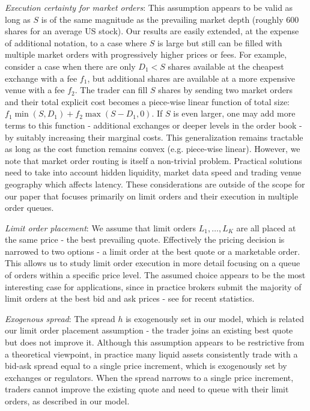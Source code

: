 \documentclass[opre,nonblindrev]{informs3}
\begin{document}
{\it Execution certainty for market orders}: This assumption appears to be valid as long as $S$ is of the same magnitude as the prevailing market depth (roughly 600 shares for an average US stock). Our results are easily extended, at the expense of additional notation, to a case where $S$ is large but still can be filled with multiple market orders with progressively higher prices or fees. For example, consider a case when there are only $D_1<S$ shares available at the cheapest exchange with a fee $f_1$, but additional shares are available at a more expensive venue with a fee $f_2$. The trader can fill $S$ shares by sending two market orders and their total explicit cost becomes a piece-wise linear function of total size: $f_1\min(S,D_1) + f_2\max(S-D_1,0)$. If $S$ is even larger, one may add more terms to this function - additional exchanges or deeper levels in the order book - by suitably increasing their marginal costs. This generalization remains tractable as long as the cost function remains convex (e.g. piece-wise linear). However, we note that market order routing is itself a non-trivial problem. Practical solutions need to take into account hidden liquidity, market data speed and trading venue geography which affects latency. These considerations are outside of the scope for our paper that focuses primarily on limit orders and their execution in multiple order queues.

{\it Limit order placement}: We assume that limit orders $L_1,\dots,L_K$ are all placed at the same price - the best prevailing quote. Effectively the pricing decision is narrowed to two options - a limit order at the best quote or a marketable order. This allows us to study limit order execution in more detail focusing on a queue of orders within a specific price level. The assumed choice  appears to be the most interesting case for applications, since in practice brokers submit the majority of limit orders at the best bid and ask prices - see \cite{Cao2008, Battalio2013} for recent statistics.

{\it Exogenous spread}: The spread $h$ is exogenously set in our model, which is related our limit order placement assumption - the trader joins an existing best quote but does not improve it. Although this assumption appears to be restrictive from a theoretical viewpoint, in practice many liquid assets consistently trade with a bid-ask spread equal to a single price increment, which is exogenously set by exchanges or regulators. When the spread narrows to a single price increment, traders cannot improve the existing quote and need to queue with their limit orders, as described in our model.
\end{document}
